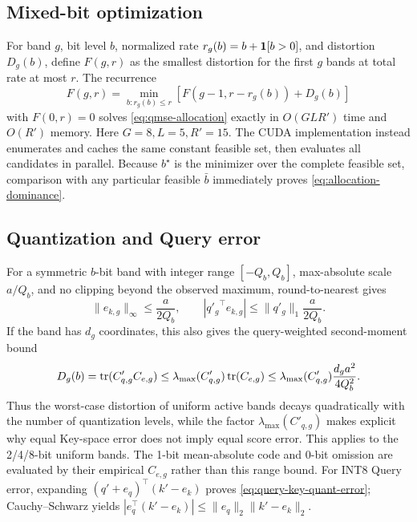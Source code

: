 \subsection{Mixed-bit optimization}

For band $g$, bit level $b$, normalized rate
$r_g(b)=b+\mathbf{1}[b>0]$, and distortion $D_g(b)$, define
$F(g,r)$ as the smallest distortion for the first $g$ bands at total rate at
most $r$.
The recurrence
\begin{equation}
 F(g,r)=\min_{b:r_g(b)\le r}
 \left[F(g-1,r-r_g(b))+D_g(b)\right]
\end{equation}
with $F(0,r)=0$ solves \cref{eq:qmse-allocation} exactly in
$O(GLR')$ time and $O(R')$ memory.
Here $G=8,L=5,R'=15$.
The CUDA implementation instead enumerates and caches the same constant
feasible set, then evaluates all candidates in parallel.
Because $b^\star$ is the minimizer over the complete feasible set, comparison
with any particular feasible $\bar b$ immediately proves
\cref{eq:allocation-dominance}.

\subsection{Quantization and Query error}

For a symmetric $b$-bit band with integer range $[-Q_b,Q_b]$,
max-absolute scale $a/Q_b$, and no clipping beyond the observed maximum,
round-to-nearest gives
\begin{equation}
 \|e_{k,g}\|_\infty\le\frac{a}{2Q_b},\qquad
 |{q'_g}^\top e_{k,g}|
 \le\|q'_g\|_1\frac{a}{2Q_b}.
\end{equation}
If the band has $d_g$ coordinates, this also gives the query-weighted
second-moment bound
\begin{equation}
 D_g(b)=\operatorname{tr}(C'_{q,g}C_{e,g})
 \le\lambda_{\max}(C'_{q,g})\operatorname{tr}(C_{e,g})
 \le\lambda_{\max}(C'_{q,g})
      \frac{d_ga^2}{4Q_b^2}.
\end{equation}
Thus the worst-case distortion of uniform active bands decays quadratically
with the number of quantization levels, while the factor
$\lambda_{\max}(C'_{q,g})$ makes explicit why equal Key-space error does not
imply equal score error.
This applies to the 2/4/8-bit uniform bands.
The 1-bit mean-absolute code and 0-bit omission are evaluated by their
empirical $C_{e,g}$ rather than this range bound.
For INT8 Query error, expanding
$(q'+e_q)^\top(k'-e_k)$ proves
\cref{eq:query-key-quant-error}; Cauchy--Schwarz yields
$|e_q^\top(k'-e_k)|\le\|e_q\|_2\|k'-e_k\|_2$.

